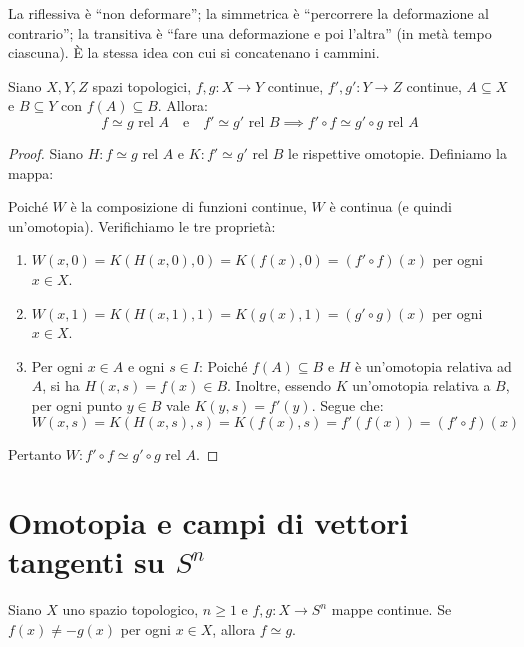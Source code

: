 \begin{intuizione}
La riflessiva \`e ``non deformare''; la simmetrica \`e ``percorrere la deformazione al contrario''; la transitiva \`e ``fare una deformazione e poi l'altra'' (in met\`a tempo ciascuna). \`E la stessa idea con cui si concatenano i cammini.
\end{intuizione}


\begin{teo}
Siano $X, Y, Z$ spazi topologici, $f, g: X \to Y$ continue, $f', g': Y \to Z$ continue, $A \subseteq X$ e $B \subseteq Y$ con $f(A) \subseteq B$. Allora:
\[
f \simeq g \text{ rel } A \quad \text{e} \quad f' \simeq g' \text{ rel } B \implies f' \circ f \simeq g' \circ g \text{ rel } A
\]
\end{teo}

\begin{proof}
Siano $H: f \simeq g \text{ rel } A$ e $K: f' \simeq g' \text{ rel } B$ le rispettive omotopie. Definiamo la mappa:

Poiché $W$ è la composizione di funzioni continue, $W$ è continua (e quindi un'omotopia). Verifichiamo le tre proprietà:
\begin{enumerate}[label=\roman*)]
    \item $W(x,0) = K(H(x,0), 0) = K(f(x), 0) = (f' \circ f)(x)$ per ogni $x \in X$.
    \item $W(x,1) = K(H(x,1), 1) = K(g(x), 1) = (g' \circ g)(x)$ per ogni $x \in X$.
    \item Per ogni $x \in A$ e ogni $s \in I$:
    Poiché $f(A) \subseteq B$ e $H$ è un'omotopia relativa ad $A$, si ha $H(x,s) = f(x) \in B$. Inoltre, essendo $K$ un'omotopia relativa a $B$, per ogni punto $y \in B$ vale $K(y,s) = f'(y)$. Segue che:
    \[
    W(x,s) = K(H(x,s), s) = K(f(x), s) = f'(f(x)) = (f' \circ f)(x)
    \]
\end{enumerate}
Pertanto $W: f' \circ f \simeq g' \circ g \text{ rel } A$.
\end{proof}

\vspace{1.5em}

\section{Omotopia e campi di vettori tangenti su $S^n$}

\begin{prop}
Siano $X$ uno spazio topologico, $n \geqslant 1$ e $f, g: X \to S^n$ mappe continue. Se $f(x) \neq -g(x)$ per ogni $x \in X$, allora $f \simeq g$.
\end{prop}

